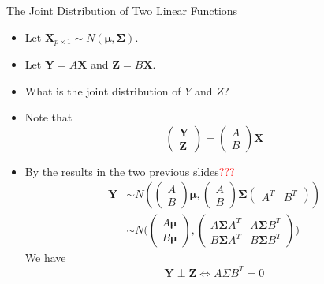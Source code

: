 \documentclass[
  ignorenonframetext,
]{beamer}
\providecommand{\tightlist}{%
  \setlength{\itemsep}{0pt}\setlength{\parskip}{0pt}}
\begin{document}
\begin{frame}{The Joint Distribution of Two Linear Functions}
\protect\hypertarget{the-joint-distribution-of-two-linear-functions}{}
\begin{itemize}
\tightlist
\item
  Let
  \(\mathbf{X}_{p\times 1}\sim N(\boldsymbol \mu, \boldsymbol \Sigma)\).
\item
  Let \(\mathbf Y=A \mathbf X\) and \(\mathbf Z=B \mathbf X\).
\item
  What is the joint distribution of \(Y\) and \(Z\)?
\item
  Note that \[\begin{pmatrix}
  \mathbf Y\\ \mathbf Z
  \end{pmatrix}=\begin{pmatrix}A \\ B\end{pmatrix}\mathbf X
  \]
\item
  By the results in the two previous slides\textcolor{red}{???} \[
  \begin{aligned}
  \mathbf Y & \sim N(\begin{pmatrix}A \\ B\end{pmatrix}\boldsymbol \mu, \begin{pmatrix}A \\ B\end{pmatrix}\boldsymbol \Sigma \begin{pmatrix}A^T & B^T\end{pmatrix})\\
  &\sim N(\begin{pmatrix}A \boldsymbol \mu \\ B\boldsymbol \mu \end{pmatrix}, \begin{pmatrix}A \boldsymbol \Sigma A^T & A \boldsymbol \Sigma B^T\\ B \boldsymbol \Sigma A^T & B \boldsymbol \Sigma B^T \end{pmatrix}\boldsymbol)
  \end{aligned} 
  \] We have \[\mathbf Y \perp \mathbf Z \Leftrightarrow A\Sigma B^T=0\]
\end{itemize}
\end{frame}
\end{document}
